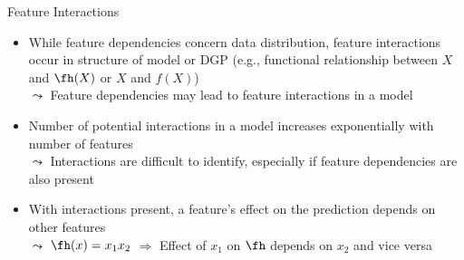 \documentclass[11pt,compress,t,notes=noshow, aspectratio=169, xcolor=table]{beamer}
\begin{document}


\begin{frame}{Feature Interactions}
\begin{itemize}
\item While feature dependencies concern data distribution, feature interactions occur in structure of model or DGP (e.g., functional relationship between $X$ and $\fh(X)$ or $X$ and $f(X)$)\\
$\leadsto$ Feature dependencies may lead to feature interactions in a model

\item Number of potential interactions in a model increases exponentially with number of features \\
$\leadsto$ Interactions are difficult to identify, especially if feature dependencies are also present

\item With interactions present, a feature's effect on the prediction depends on other features\\
$\leadsto$
$\fh(x) = x_1 x_2$ $\Rightarrow$ Effect of $x_1$ on $\fh$ depends on $x_2$ and vice versa

\begin{columns}[T, totalwidth=\textwidth]
\begin{column}{0.5\textwidth}
\centering
{}
\end{column}
\end{columns}
\end{itemize}
\end{frame}
\end{document}
